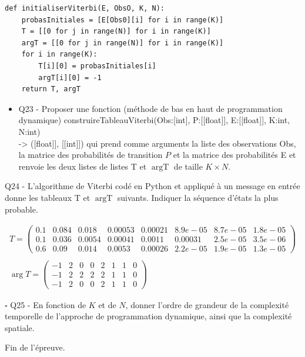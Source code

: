 \documentclass[10pt]{article}
\begin{document}
\begin{verbatim}
def initialiserViterbi(E, ObsO, K, N):
    probasInitiales = [E[Obs0][i] for i in range(K)]
    T = [[0 for j in range(N)] for i in range(K)]
    argT = [[0 for j in range(N)] for i in range(K)]
    for i in range(K):
        T[i][0] = probasInitiales[i]
        argT[i][0] = -1
    return T, argT
\end{verbatim}

\begin{itemize}
  \item Q23 - Proposer une fonction (méthode de bas en haut de programmation dynamique) construireTableauViterbi(Obs:[int], P:[[float]], E:[[float]], K:int, N:int)\\[0pt]
-> ([float]], [[int]]) qui prend comme arguments la liste des observations Obs, la matrice des probabilités de transition $P$ et la matrice des probabilités E et renvoie les deux listes de listes T et $\operatorname{argT}$ de taille $K \times N$.
\end{itemize}

Q24 - L'algorithme de Viterbi codé en Python et appliqué à un message en entrée\\
donne les tableaux T et $\operatorname{argT}$ suivants. Indiquer la séquence d'états la plus probable.

$$
\begin{gathered}
T=\left(\begin{array}{cccccccc}
0.1 & 0.084 & 0.018 & 0.00053 & 0.00021 & 8.9 e-05 & 8.7 e-05 & 1.8 e-05 \\
0.1 & 0.036 & 0.0054 & 0.00041 & 0.0011 & 0.00031 & 2.5 e-05 & 3.5 e-06 \\
0.6 & 0.09 & 0.014 & 0.0053 & 0.00026 & 2.2 e-05 & 1.9 e-05 & 1.3 e-05
\end{array}\right) \\
\\
\arg T=\left(\begin{array}{cccccccc}
-1 & 2 & 0 & 0 & 2 & 1 & 1 & 0 \\
-1 & 2 & 2 & 2 & 2 & 1 & 1 & 0 \\
-1 & 2 & 0 & 0 & 2 & 1 & 1 & 0
\end{array}\right)
\end{gathered}
$$

$\square$ Q25 - En fonction de $K$ et de $N$, donner l'ordre de grandeur de la complexité temporelle de l'approche de programmation dynamique, ainsi que la complexité spatiale.

Fin de l'épreuve.
\end{document}
